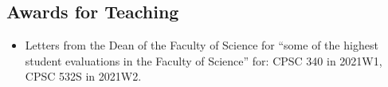 \documentclass[10pt]{article}
\begin{document}
\nasubsection{
\subsection{Consultant} %
}



\subsection{Awards for Teaching} %

\begin{itemize}[leftmargin=5em]
    \item[] Letters from the Dean of the Faculty of Science for ``some of the highest student evaluations in the Faculty of Science'' for: CPSC 340 in 2021W1, CPSC 532S in 2021W2.
\end{itemize}
\end{document}
